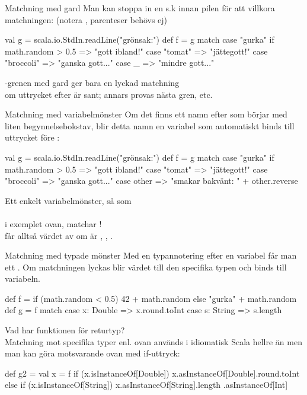 \begin{Slide}{Matchning med gard}
Man kan stoppa in en s.k   innan pilen \code{=>} för att villkora matchningen: (notera , parenteser behövs ej)
\begin{Code}
val g = scala.io.StdIn.readLine("grönsak:")
def f = g match {
  case "gurka" if math.random > 0.5 => "gott ibland!"
  case "tomat" => "jättegott!"
  case "broccoli" => "ganska gott..."
  case _ => "mindre gott..."
}
\end{Code}
-grenen med gard ger bara en lyckad matchning \\ om uttrycket efter  är sant; annars provas nästa gren, etc.
\end{Slide}

\begin{Slide}{Matchning med variabelmönster}\SlideFontSmall
Om det finns ett namn efter  som börjar med liten begynnelsebokstav, blir detta namn en variabel som automatiskt binds till uttrycket före :

\begin{Code}
val g = scala.io.StdIn.readLine("grönsak:")
def f = g match {
  case "gurka" if math.random > 0.5 => "gott ibland!"
  case "tomat" => "jättegott!"
  case "broccoli" => "ganska gott..."
  case other => "smakar bakvänt: " + other.reverse
}
\end{Code}

Ett enkelt variabelmönster, så som \\  \\ i exemplet ovan, matchar ! \\ får alltså värdet av  om   är , , .  

\end{Slide}





\begin{Slide}{Matchning med typade mönster}\SlideFontSmall
Med en typannotering efter en variabel får man ett  . Om matchningen lyckas blir värdet  till den specifika typen och binds till variabeln.
\begin{Code}
def f = if (math.random < 0.5) 42 + math.random else "gurka" + math.random
def g = f match {
  case x: Double => x.round.toInt
  case s: String => s.length
}
\end{Code}
Vad har funktionen  för returtyp? \\ \pause
Matchning mot specifika typer enl. ovan används i idiomatisk Scala hellre än  men man kan göra motsvarande ovan med if-uttryck:
\begin{Code}
def g2 = {
  val x = f
  if (x.isInstanceOf[Double]) x.asInstanceOf[Double].round.toInt
  else if (x.isInstanceOf[String]) x.asInstanceOf[String].length
}.asInstanceOf[Int]
\end{Code}
\end{Slide}


